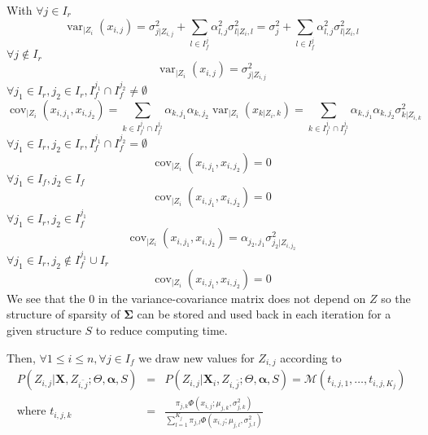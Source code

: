 \documentclass[11pt,a4paper]{report}
\begin{document}
With $\forall j \in I_r$ 
\begin{equation}
	\operatorname{var}_{|Z_{i}}(x_{i,j})=\sigma_{j|Z_{i,j}}^2+ \sum_{l \in I_f^j} \alpha_{l,j}^2\sigma_{l|Z_i,l}^2=\sigma_{j}^2+ \sum_{l \in I_f^j} \alpha_{l,j}^2\sigma_{l|Z_i,l}^2
\end{equation}			
	$\forall j \notin I_r $
\begin{equation}
	\operatorname{var}_{|Z_{i}}(x_{i,j})=\sigma_{j|Z_{i,j}}^2
\end{equation}			
	$\forall j_1 \in I_r, j_2 \in I_r,I_f^{j_1}\cap I_f^{j_2}\neq \emptyset $
	\begin{equation}
	\operatorname{cov}_{|Z_{i}}(x_{i,j_1},x_{i,j_2})=\sum_{k\in I_f^{j_1}\cap I_f^{j_2}}\alpha_{k,j_1}\alpha_{k,j_2}\operatorname{var}_{|Z_i}(x_{k|Z_i,k}) =\sum_{k\in I_f^{j_1}\cap I_f^{j_2}}\alpha_{k,j_1}\alpha_{k,j_2}\sigma_{k|Z_{i,k}}^2
\end{equation}
	$\forall j_1 \in I_r, j_2 \in I_r,I_f^{j_1}\cap I_f^{j_2}= \emptyset $
	\begin{equation}
	\operatorname{cov}_{|Z_{i}}(x_{i,j_1},x_{i,j_2})=0
\end{equation}
	$\forall j_1 \in I_f, j_2 \in I_f$
	\begin{equation}
	\operatorname{cov}_{|Z_{i}}(x_{i,j_1},x_{i,j_2})=0
\end{equation}
	$\forall j_1 \in I_r, j_2 \in I_f^{j_1}$
	\begin{equation}
	\operatorname{cov}_{|Z_{i}}(x_{i,j_1},x_{i,j_2})= \alpha_{j_2,j_1}\sigma^2_{j_2|Z_{i,j_2}}
\end{equation}
$\forall j_1 \in I_r, j_2 \notin I_f^{j_1}\cup I_r$
	\begin{equation}
	\operatorname{cov}_{|Z_{i}}(x_{i,j_1},x_{i,j_2})= 0
\end{equation}
We see that the $0$ in the variance-covariance matrix does not depend on $Z$ so the structure of sparsity of $\boldsymbol{\Sigma}$ can be stored and used back in each iteration for a given structure $S$ to reduce computing time.

	Then, $\forall 1\leq i \leq n, \forall j \in I_f$ we draw new values for $Z_{i,j}$ according to
	\begin{eqnarray}
		P(Z_{i,j}|\boldsymbol{X},Z_{\bar{i,j}};\Theta,\boldsymbol{\alpha},S)&=&P(Z_{i,j}|\boldsymbol{X}_i,Z_{i,\bar{j}};\Theta,\boldsymbol{\alpha},S)=\mathcal{M}(t_{i,j,1},\dots ,t_{i,j,K_j}) \\
		\textrm{where } t_{i,j,k}&=&\frac{\pi_{j,k}\Phi(x_{i,j};\mu_{j,k},\sigma_{j,k}^2)}{\sum_{l=1}^{K_j}\pi_{j,l}\Phi(x_{i,j};\mu_{j,l},\sigma_{j,l}^2) }
	\end{eqnarray}
		
\end{document}
